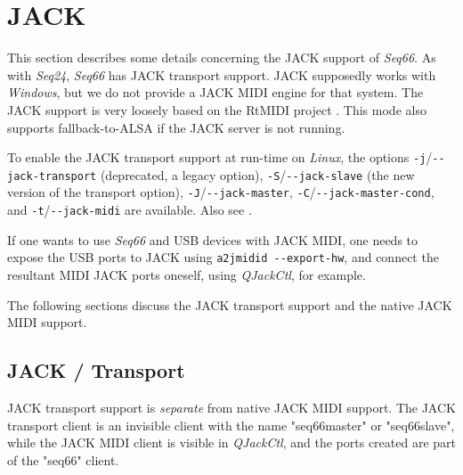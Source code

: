 %
%
%

\section{JACK}
\label{sec:jack}

   This section describes some details concerning the JACK support of
   \textsl{Seq66}.
   As with \textsl{Seq24}, \textsl{Seq66} has JACK transport support.
   JACK supposedly works with \textsl{Windows}, but we do not provide a JACK
   MIDI engine for that system.
   The JACK support is very loosely based on the RtMIDI project
   \cite{rtmidi}.
   This mode also supports fallback-to-ALSA if the JACK
   server is not running.

   To enable the JACK transport support at run-time on
   \textsl{Linux}, the options
   \texttt{-j}/\texttt{-{}-jack-transport} (deprecated, a legacy option),
   \texttt{-S}/\texttt{-{}-jack-slave} (the new version of the transport
   option),
   \texttt{-J}/\texttt{-{}-jack-master},
   \texttt{-C}/\texttt{-{}-jack-master-cond},
   and \texttt{-t}/\texttt{-{}-jack-midi} are available.
   Also see .

   If one wants to use \textsl{Seq66} and USB devices
   with JACK MIDI, one needs to expose the USB ports to JACK using
   \texttt{a2jmidid -{}-export-hw}, and connect the resultant MIDI JACK ports
   oneself, using \textsl{QJackCtl}, for example.

   The following sections discuss the JACK transport support and the native
   JACK MIDI support.

\subsection{JACK / Transport}
\label{subsec:jack_transport}

   JACK transport support is \textsl{separate} from native JACK MIDI support.
   The JACK transport client is an invisible client with the
   name "seq66master" or "seq66slave", while the JACK MIDI client is visible in
   \textsl{QJackCtl}, and the ports created are part of the
   "seq66" client.


